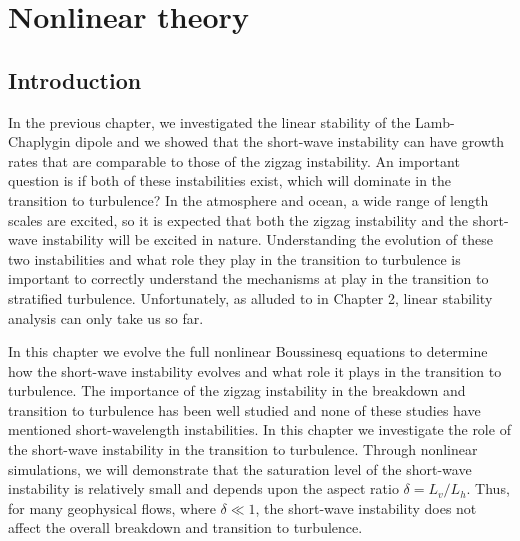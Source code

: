 %
% 
\chapter{Nonlinear theory}

\section{Introduction}
In the previous chapter, we investigated the linear stability of the Lamb-Chaplygin dipole and we showed that the short-wave instability can have growth rates that are comparable to those of the zigzag instability. An important question is if both of these instabilities exist, which will dominate in the transition to turbulence? In the atmosphere and ocean, a wide range of length scales are excited, so it is expected that both the zigzag instability and the short-wave instability will be excited in nature. Understanding the evolution of these two instabilities and what role they play in the transition to turbulence is important to correctly understand the mechanisms at play in the transition to stratified turbulence. Unfortunately, as alluded to in Chapter 2, linear stability analysis can only take us so far. 

In this chapter we evolve the full nonlinear Boussinesq equations to determine how the short-wave instability evolves and what role it plays in the transition to turbulence. The importance of the zigzag instability in the breakdown and transition to turbulence has been well studied \cite{augier2012,waitesmol2008,augierbillant2011,delonclebc2008} and none of these studies have mentioned short-wavelength instabilities. In this chapter we investigate the role of the short-wave instability in the transition to turbulence. Through nonlinear simulations, we will demonstrate that the saturation level of the short-wave instability is relatively small and depends upon the aspect ratio $\delta=L_{v}/L_{h}$. Thus, for many geophysical flows, where $\delta\ll 1$, the short-wave instability does not affect the overall breakdown and transition to turbulence. 

